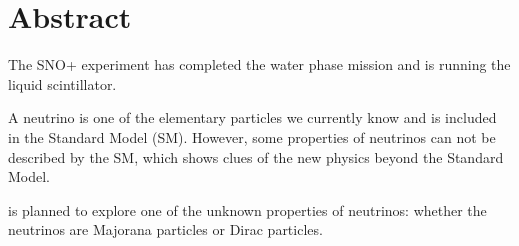 \section{Abstract}

The SNO+ experiment has completed the water phase mission and is running the liquid scintillator. 

A neutrino is one of the elementary particles we currently know and is included in the Standard Model (SM). However, some properties of neutrinos can not be described by the SM, which shows clues of the new physics beyond the Standard Model.


is planned to explore one of the unknown properties of neutrinos: whether the neutrinos are Majorana particles or Dirac particles.